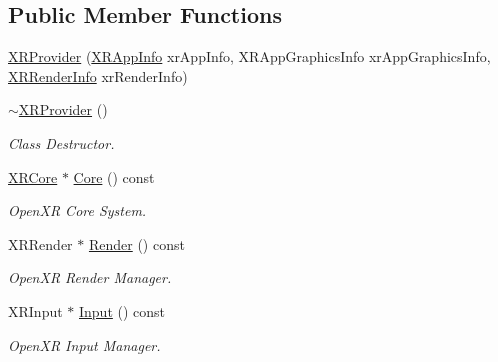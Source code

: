 \subsection*{Public Member Functions}
\begin{DoxyCompactItemize}
\item 
\mbox{\hyperlink{class_open_x_r_provider_1_1_x_r_provider_afa61fccc9d633ac2c4b8e1a8f07871bb}{X\+R\+Provider}} (\mbox{\hyperlink{struct_open_x_r_provider_1_1_x_r_app_info}{X\+R\+App\+Info}} xr\+App\+Info, X\+R\+App\+Graphics\+Info xr\+App\+Graphics\+Info, \mbox{\hyperlink{struct_open_x_r_provider_1_1_x_r_render_info}{X\+R\+Render\+Info}} xr\+Render\+Info)
\item 
\mbox{\hyperlink{class_open_x_r_provider_1_1_x_r_provider_a7bce537abed2b4a5ebb7c34f61ccaae8}{$\sim$\+X\+R\+Provider}} ()
\begin{DoxyCompactList}\small\item\em Class Destructor. \end{DoxyCompactList}\item 
\mbox{\hyperlink{class_open_x_r_provider_1_1_x_r_core}{X\+R\+Core}} $\ast$ \mbox{\hyperlink{class_open_x_r_provider_1_1_x_r_provider_a46b4b3129ad359a0ffc50634f94d6e5a}{Core}} () const
\begin{DoxyCompactList}\small\item\em Open\+XR Core System. \end{DoxyCompactList}\item 
X\+R\+Render $\ast$ \mbox{\hyperlink{class_open_x_r_provider_1_1_x_r_provider_ad02657f567d74bf37e97f9ad21979215}{Render}} () const
\begin{DoxyCompactList}\small\item\em Open\+XR Render Manager. \end{DoxyCompactList}\item 
X\+R\+Input $\ast$ \mbox{\hyperlink{class_open_x_r_provider_1_1_x_r_provider_ad3456bedb904418379eabff57e86944a}{Input}} () const
\begin{DoxyCompactList}\small\item\em Open\+XR Input Manager. \end{DoxyCompactList}\end{DoxyCompactItemize}
